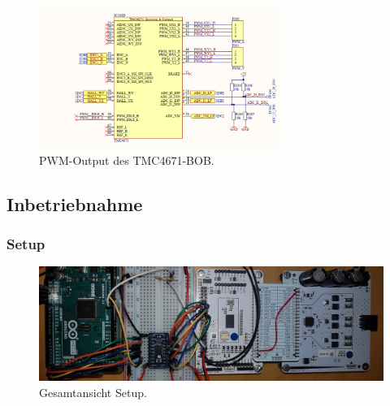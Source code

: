 \begin{figure}[H]
	\centering
	\includegraphics[width=0.7\textwidth]{graphics/TMC4671_PWM_BOB_Schematic}
	\caption{PWM-Output des TMC4671-BOB. \cite{trinamicmotion_control_gmbh__co_kg_tmc4671-bob_2020}}
	\label{fig:Schema_PWM_FOC_Treiber}
\end{figure} 

\subsection{Inbetriebnahme}

\subsubsection{Setup}\label{Appendix:TMC4671_Setup}

\begin{figure}[H]
	\centering
	\includegraphics[angle=270,width=\textwidth]{graphics/2_komplett1}
	\caption{Gesamtansicht Setup.}
	\label{fig:2_komplett1}
\end{figure}

